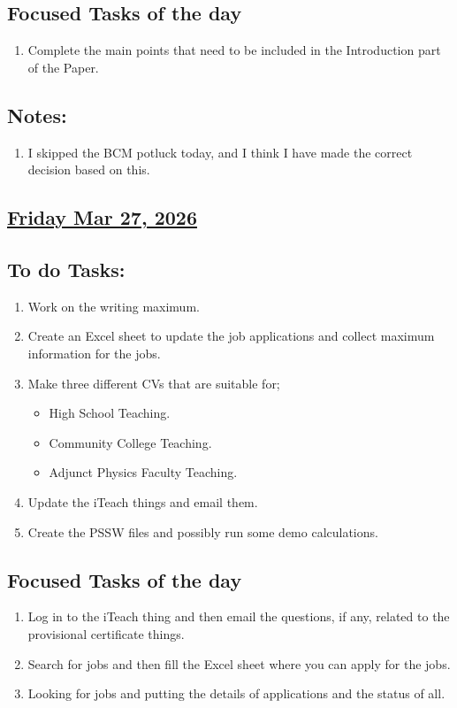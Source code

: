 \subsection*{Focused Tasks of the day}
\begin{enumerate}[\ding{212}]  
    \item Complete the main points that need to be included in the Introduction part of the Paper.
\end{enumerate}
\subsection*{Notes:}
\begin{enumerate}
    \item I skipped the BCM potluck today, and I think I have made the correct decision based on this. 
\end{enumerate}
\subsection*{\underline{Friday Mar 27, 2026}}
\subsection*{To do Tasks:}
\begin{enumerate}
    \item Work on the writing maximum. \xmark
    \item Create an Excel sheet to update the job applications and collect maximum information for the jobs.
    \item Make three different CVs that are suitable for;
    \begin{itemize}
        \item High School Teaching.
        \item Community College Teaching.
        \item Adjunct Physics Faculty Teaching.
    \end{itemize}
    \item Update the iTeach things and email them.
    \item Create the PSSW files and possibly run some demo calculations. \xmark
\end{enumerate}
\subsection*{Focused Tasks of the day}
\begin{enumerate}[\ding{212}]  
    \item Log in to the iTeach thing and then email the questions, if any, related to the provisional certificate things.
    \item Search for jobs and then fill the Excel sheet where you can apply for the jobs.
    \item Looking for jobs and putting the details of applications and the status of all. 
\end{enumerate}
